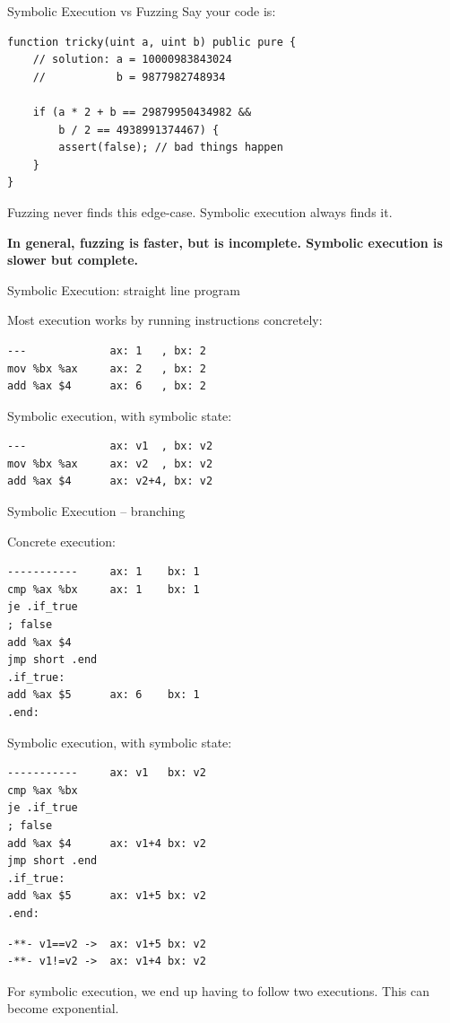 \documentclass[aspectratio=169]{beamer}
\begin{document}
\begin{frame}[fragile=singleslide]{Symbolic Execution vs Fuzzing}
Say your code is:

\begin{Verbatim}[frame=single, framerule=0.2mm, framesep=2mm,fontsize=\small]
function tricky(uint a, uint b) public pure {
	// solution: a = 10000983843024
	//           b = 9877982748934

	if (a * 2 + b == 29879950434982 &&
	    b / 2 == 4938991374467) {
		assert(false); // bad things happen
	}
}
\end{Verbatim}

Fuzzing never finds this edge-case. Symbolic execution always finds it.
\bigskip

\textbf{In general, fuzzing is faster, but is incomplete. Symbolic execution is slower but complete.}

\end{frame}



\begin{frame}[fragile=singleslide]{Symbolic Execution: straight line program}

Most execution works by running instructions concretely:
\begin{verbatim}
---             ax: 1   , bx: 2
mov %bx %ax     ax: 2   , bx: 2
add %ax $4      ax: 6   , bx: 2
\end{verbatim}
\bigskip

Symbolic execution, with symbolic state:
\begin{verbatim}
---             ax: v1  , bx: v2
mov %bx %ax     ax: v2  , bx: v2
add %ax $4      ax: v2+4, bx: v2
\end{verbatim}
\end{frame}

\begin{frame}[fragile=singleslide]{Symbolic Execution -- branching}
\begin{minipage}[t]{0.45\textwidth}
Concrete execution:
\begin{Verbatim}[fontsize=\small]
-----------     ax: 1    bx: 1
cmp %ax %bx     ax: 1    bx: 1
je .if_true
; false
add %ax $4
jmp short .end
.if_true:
add %ax $5      ax: 6    bx: 1
.end:
\end{Verbatim}
\end{minipage}%
\begin{minipage}[t]{0.45\textwidth}
Symbolic execution, with symbolic state:
\begin{Verbatim}[fontsize=\small]
-----------     ax: v1   bx: v2
cmp %ax %bx
je .if_true
; false
add %ax $4      ax: v1+4 bx: v2
jmp short .end
.if_true:
add %ax $5      ax: v1+5 bx: v2
.end:
\end{Verbatim}
\begin{Verbatim}[fontsize=\small]
-**- v1==v2 ->  ax: v1+5 bx: v2
-**- v1!=v2 ->  ax: v1+4 bx: v2
\end{Verbatim}
\end{minipage}
\bigskip

For symbolic execution, we end up having to follow two executions. This can become exponential.
\end{frame}
\end{document}
